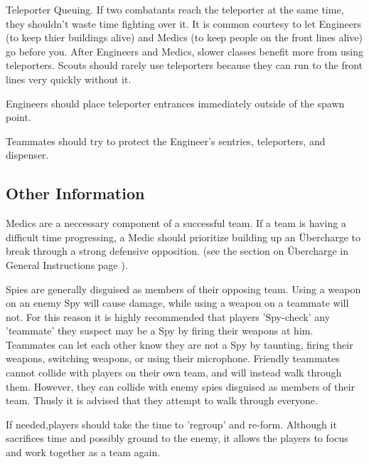 Teleporter Queuing.  If two combatants reach the teleporter at the same time, they shouldn't waste time fighting over it. It is common courtesy to let Engineers (to keep thier buildings alive) and Medics (to keep people on the front lines alive) go before you. After Engineers and Medics, slower classes benefit more from using teleporters. Scouts should rarely use teleporters because they can run to the front lines very quickly without it.

Engineers should place teleporter entrances immediately outside of the spawn point. 

Teammates should try to protect the Engineer's sentries, teleporters, and dispenser.

\subsection{Other Information}
Medics are a neccessary component of a successful team. If a team is having a difficult time progressing, a Medic should prioritize building up an Übercharge to break through a strong defensive opposition. (see the section on Übercharge in General Instructions page \pageref{Ubercharge}).

Spies are generally disguised as members of their opposing team. Using a weapon on an enemy Spy will cause damage, while using a weapon on a teammate will not. For this reason it is highly recommended that players 'Spy-check' any 'teammate' they suspect may be a Spy by firing their weapons at him. Teammates can let each other know they are not a Spy by taunting, firing their weapons, switching weapons, or using their microphone. Friendly teammates cannot collide with players on their own team, and will instead walk through them. However, they can collide with enemy spies disguised as members of their team. Thusly it is advised that they attempt to walk through everyone.

If needed,players should take the time to 'regroup' and re-form. Although it sacrifices time and possibly ground to the enemy, it allows the players to focus and work together as a team again.